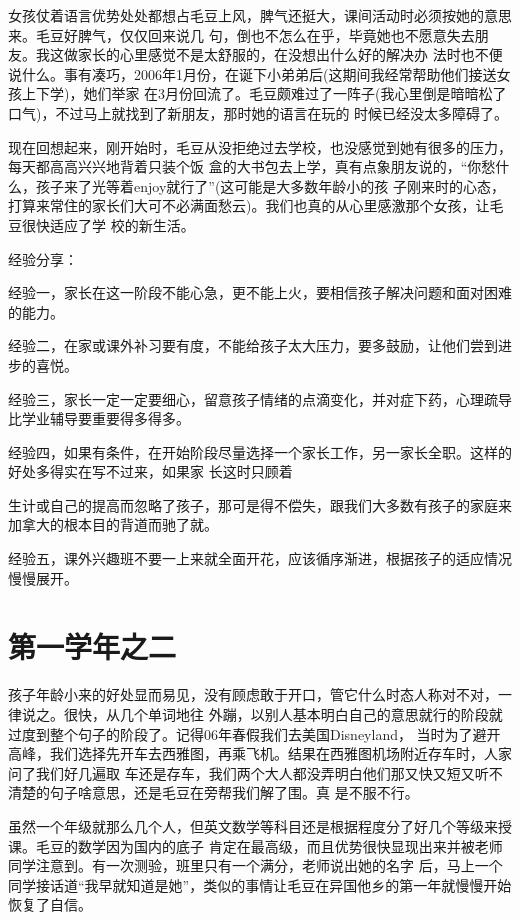 \documentclass[11pt,a4paper,onecolumn]{article}
\begin{document}
女孩仗着语言优势处处都想占毛豆上风，脾气还挺大，课间活动时必须按她的意思来。毛豆好脾气，仅仅回来说几
句，倒也不怎么在乎，毕竟她也不愿意失去朋友。我这做家长的心里感觉不是太舒服的，在没想出什么好的解决办
法时也不便说什么。事有凑巧，2006年1月份，在诞下小弟弟后(这期间我经常帮助他们接送女孩上下学)，她们举家
在3月份回流了。毛豆颇难过了一阵子(我心里倒是暗暗松了口气)，不过马上就找到了新朋友，那时她的语言在玩的
时候已经没太多障碍了。

现在回想起来，刚开始时，毛豆从没拒绝过去学校，也没感觉到她有很多的压力，每天都高高兴兴地背着只装个饭
盒的大书包去上学，真有点象朋友说的，``你愁什么，孩子来了光等着enjoy就行了''(这可能是大多数年龄小的孩
子刚来时的心态，打算来常住的家长们大可不必满面愁云)。我们也真的从心里感激那个女孩，让毛豆很快适应了学
校的新生活。

经验分享：

经验一，家长在这一阶段不能心急，更不能上火，要相信孩子解决问题和面对困难的能力。

经验二，在家或课外补习要有度，不能给孩子太大压力，要多鼓励，让他们尝到进步的喜悦。

经验三，家长一定一定要细心，留意孩子情绪的点滴变化，并对症下药，心理疏导比学业辅导要重要得多得多。

经验四，如果有条件，在开始阶段尽量选择一个家长工作，另一家长全职。这样的好处多得实在写不过来，如果家
长这时只顾着

生计或自己的提高而忽略了孩子，那可是得不偿失，跟我们大多数有孩子的家庭来加拿大的根本目的背道而驰了就。

经验五，课外兴趣班不要一上来就全面开花，应该循序渐进，根据孩子的适应情况慢慢展开。

\section{第一学年之二}


孩子年龄小来的好处显而易见，没有顾虑敢于开口，管它什么时态人称对不对，一律说之。很快，从几个单词地往
外蹦，以别人基本明白自己的意思就行的阶段就过度到整个句子的阶段了。记得06年春假我们去美国Disneyland，
当时为了避开高峰，我们选择先开车去西雅图，再乘飞机。结果在西雅图机场附近存车时，人家问了我们好几遍取
车还是存车，我们两个大人都没弄明白他们那又快又短又听不清楚的句子啥意思，还是毛豆在旁帮我们解了围。真
是不服不行。


虽然一个年级就那么几个人，但英文数学等科目还是根据程度分了好几个等级来授课。毛豆的数学因为国内的底子
肯定在最高级，而且优势很快显现出来并被老师同学注意到。有一次测验，班里只有一个满分，老师说出她的名字
后，马上一个同学接话道``我早就知道是她''，类似的事情让毛豆在异国他乡的第一年就慢慢开始恢复了自信。
\end{document}
